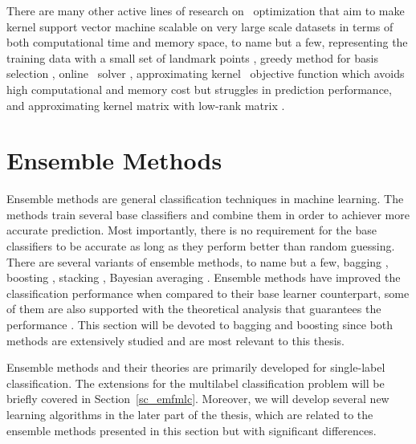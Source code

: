 {There are many other active lines of research on \svm\ optimization that aim to make kernel support vector machine scalable on very large scale datasets in terms of both computational time and memory space, to name but a few, representing the training data with a small set of landmark points \citep{Pavlov00towards,Boley04training,Yu05making,Zhang08improved}, greedy method for basis selection \citep{Keerthi06building}, online \svm\ solver \citep{Bordes05fast}, approximating kernel \svm\ objective function \citep{Zhang12scaling, Le13fast} which avoids high computational and memory cost but struggles in prediction performance, and approximating kernel matrix with low-rank matrix \citep{Smola00sparse,Fine02efficient,Drineas05on,Si14memory}.
\fi


%
%
%
\section{Ensemble Methods} \label{sc_em}

Ensemble methods are general classification techniques in machine learning.
The methods train several base classifiers and combine them in order to achiever more accurate prediction.
Most importantly, there is no requirement for the base classifiers to be accurate as long as they perform better than random guessing.
There are several variants of ensemble methods, to name but a few, bagging \citep{Breiman96bagging}, boosting \citep{Freund97a,Schapire99improved}, stacking \citep{Smyth99linearly}, Bayesian averaging \citep{Freund04generalization}.
Ensemble methods have improved the classification performance when compared to their base learner counterpart, some of them are also supported with the theoretical analysis that guarantees the performance \citep{Schapire97boosting,Koltchinskii00empirical,Cortes14semble,Cortes14deep}.
This section will be devoted to bagging and boosting since both methods are extensively studied and are most relevant to this thesis.

Ensemble methods and their theories are primarily developed for single-label classification.
The extensions for the multilabel classification problem will be briefly covered in Section~\ref{sc_emfmlc}.
Moreover, we will develop several new learning algorithms in the later part of the thesis, which are related to the ensemble methods presented in this section but with significant differences.



}
